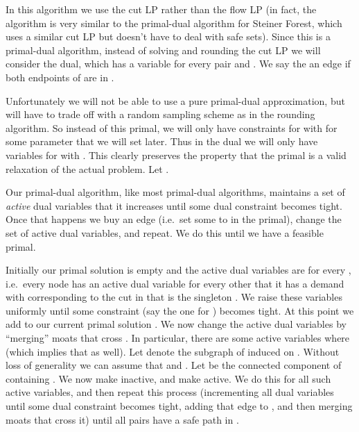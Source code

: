 \documentclass[11pt,letterpaper]{article}
\theoremstyle{definition}
\newcounter{note}[section]
\begin{document}
In this algorithm we use the cut LP rather than the
flow LP (in fact, the algorithm is very similar to the primal-dual
algorithm for Steiner Forest, which uses a similar cut LP but doesn't
have to deal with safe sets).  Since this is a primal-dual algorithm,
instead of solving and rounding the cut LP we will consider the dual,
which has a variable  for every pair  and .  We say the an edge  if both endpoints of  are in .


Unfortunately we will not be able to use a pure primal-dual
approximation, but will have to trade off with a random sampling
scheme as in the rounding algorithm.  So instead of this primal, we
will only have constraints for  with  for
some parameter  that we will set later.  Thus in the dual we will
only have variables   for  with .
This clearly preserves the property that the primal is a valid
relaxation of the actual problem.  Let .

Our primal-dual algorithm, like most primal-dual algorithms,
maintains a set of \emph{active} dual variables that it increases
until some dual constraint becomes tight.  Once that happens we buy an
edge (i.e.\ set some  to  in the primal), change the set of
active dual variables, and repeat.  We do this until we have a
feasible primal.

Initially our primal solution  is empty and the active dual
variables are  for every , i.e.\ every
node  has an active dual variable for every other  that it has a
demand with corresponding to the cut in  that is the singleton
.  We raise these variables uniformly until some constraint
(say the one for ) becomes tight.  At this point we add
 to our current primal solution .  We now change the active dual
variables by ``merging'' moats that cross .  In particular, there are some active variables  where  (which implies
that  as well).  Let 
denote the subgraph of  induced on
.  Without loss of generality we can assume that  and
.  Let  be the connected component of
 containing .  We now make  inactive, and
make  active.  We do this for all such active
variables, and then repeat this process (incrementing all dual
variables until some dual constraint becomes tight, adding that edge
to , and then merging moats that cross it) until all pairs  have a safe path in .
\end{document}
